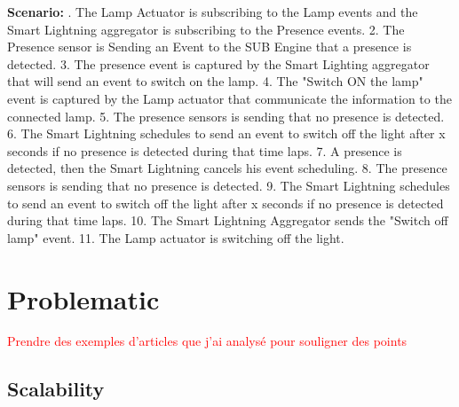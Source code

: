 \documentclass[11pt]{article}
\begin{document}
\newline
\newline
\textbf{Scenario:}
. The Lamp Actuator is subscribing to the Lamp events and the Smart Lightning aggregator is subscribing to the Presence events.
2. The Presence sensor is Sending an Event to the SUB Engine that a presence is detected. 
3. The presence event is captured by the Smart Lighting aggregator that will send an event to switch on the lamp. 
4. The "Switch ON the lamp" event is captured by the Lamp actuator that communicate the information to the connected lamp. 
5. The presence sensors is sending that no presence is detected. 
6. The Smart Lightning schedules to send an event to switch off the light after x seconds if no presence is detected during that time laps.
7. A presence is detected, then the Smart Lightning cancels his event scheduling.
8. The presence sensors is sending that no presence is detected. 
9. The Smart Lightning schedules to send an event to switch off the light after x seconds if no presence is detected during that time laps.
10. The Smart Lightning Aggregator sends the "Switch off lamp" event.
11. The Lamp actuator is switching off the light.


\section{Problematic}

\textcolor{red}{Prendre des exemples d'articles que j'ai analysé pour souligner des points}

\subsection{Scalability}
\end{document}
